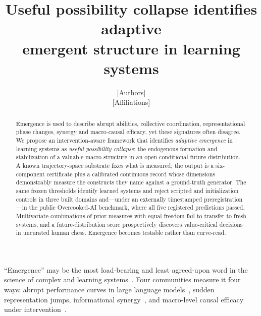 \documentclass[11pt]{article}
\title{\textbf{Useful possibility collapse identifies adaptive\\emergent structure in learning systems}}
\author{[Authors]\\[2pt]\small [Affiliations]}
\date{}
\theoremstyle{definition}
\begin{document}
\maketitle

\begin{abstract}
\noindent
Emergence is used to describe abrupt abilities, collective coordination,
representational phase changes, synergy and macro-causal efficacy, yet
these signatures often disagree. We propose an intervention-aware
framework that identifies \emph{adaptive emergence} in learning systems
as \emph{useful possibility collapse}: the endogenous formation and
stabilization of a valuable macro-structure in an open conditional
future distribution. A known trajectory-space substrate fixes what is
measured; the output is a six-component certificate plus a calibrated
continuous record whose dimensions demonstrably measure the constructs
they name against a ground-truth generator. The same frozen thresholds
identify learned systems and reject scripted and initialization
controls in three built domains and---under an externally timestamped
preregistration---in the public Overcooked-AI benchmark, where all
five registered predictions passed. Multivariate combinations of prior
measures with equal freedom fail to transfer to fresh systems, and a
future-distribution score prospectively discovers value-critical
decisions in uncurated human chess. Emergence becomes testable rather
than curve-read.
\end{abstract}

\vspace{1em}

``Emergence'' may be the most load-bearing and least agreed-upon word
in the science of complex and learning
systems~\cite{anderson1972,bedau1997,holland1998,mitchell2009,crutchfield1994,batterman2002}.
Four communities measure it four ways: abrupt performance curves in
large language
models~\cite{kaplan2020,brown2020,bommasani2021,hoffmann2022,wei2022,ganguli2022,srivastava2023},
sudden representation jumps, informational
synergy~\cite{williamsbeer2010,bertschinger2014,lizier2018,rosas2020,mediano2021,luppi2022},
and macro-level causal efficacy under
intervention~\cite{hoel2013,hoel2025,barnett2023}.
\end{document}
